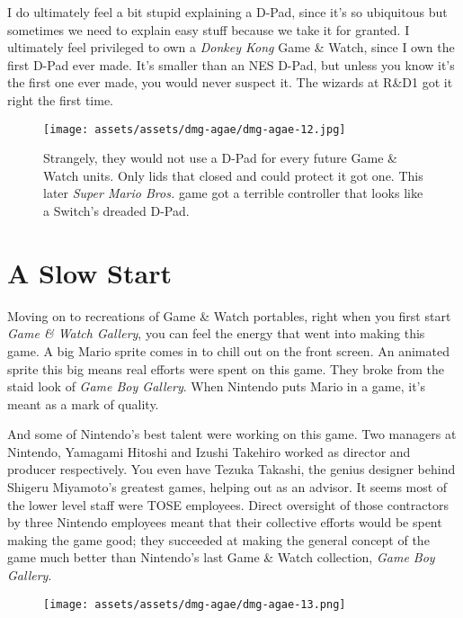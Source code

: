 \documentclass{book}
\begin{document}
I do ultimately feel a bit stupid explaining a D-Pad, since it’s so ubiquitous but sometimes we need to explain easy stuff because we take it for granted. I ultimately feel privileged to own a \emph{Donkey Kong} Game \& Watch, since I own the first D-Pad ever made. It’s smaller than an NES D-Pad, but unless you know it’s the first one ever made, you would never suspect it. The wizards at R\&D1 got it right the first time.

\begin{figure}[hbt]
\vskip 10pt
\centering \texttt{[image: assets/assets/dmg-agae/dmg-agae-12.jpg]}\par\pagetwodescription Strangely, they would not use a D-Pad for every future Game \& Watch units. Only lids that closed and could protect it got one. This later \emph{Super Mario Bros.} game got a terrible controller that looks like a Switch’s dreaded D-Pad.
\vskip 6pt
\end{figure}

\FloatBarrier\needspace{10mm}\section*{A Slow Start}\nopagebreak[4]

Moving on to recreations of Game \& Watch portables, right when you first start \emph{Game \& Watch Gallery}, you can feel the energy that went into making this game. A big Mario sprite comes in to chill out on the front screen. An animated sprite this big means real efforts were spent on this game. They broke from the staid look of \emph{Game Boy Gallery}. When Nintendo puts Mario in a game, it’s meant as a mark of quality.

And some of Nintendo’s best talent were working on this game. Two managers at Nintendo, Yamagami Hitoshi and Izushi Takehiro worked as director and producer respectively. You even have Tezuka Takashi, the genius designer behind Shigeru Miyamoto’s greatest games, helping out as an advisor. It seems most of the lower level staff were TOSE employees. Direct oversight of those contractors by three Nintendo employees meant that their collective efforts would be spent making the game good; they succeeded at making the general concept of the game much better than Nintendo’s last Game \& Watch collection, \emph{Game Boy Gallery}.

\begin{figure}[hbt]
\vskip 10pt
\centering \texttt{[image: assets/assets/dmg-agae/dmg-agae-13.png]}
\vskip 6pt
\end{figure}
\end{document}
